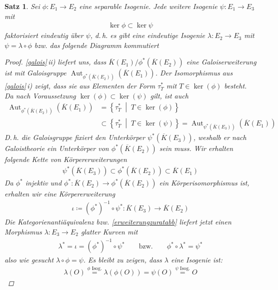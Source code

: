 \documentclass[english, german, parskip=half]{scrartcl}
\newtheorem{Satz}{Satz}[section]
\theoremstyle{definition}
\theoremstyle{remark}
\newcommand*{\algK}{\ensuremath{\overline K}} %
\newcommand*{\longto}{\longrightarrow}
\renewcommand{\O}{O}
\DeclareMathOperator{\Aut}{Aut} %
\begin{document}
\begin{Satz}\label{homomorphiesatz}
  Sei $\phi\colon E_1\to E_2$ eine separable Isogenie.
  Jede weitere Isogenie $\psi\colon E_1\to E_3$ mit
  \begin{gather*}
    \ker\phi \subset \ker\psi
  \end{gather*}
  faktorisiert eindeutig über $\psi$, d.\,h. es gibt eine eindeutige
  Isogenie $\lambda\colon E_2\to E_3$ mit
  $\psi = \lambda\circ\phi$
  bzw. das folgende Diagramm kommutiert
  \begin{center}
  \end{center}
  \begin{proof}
    \autoref{galois}\,ii) liefert uns, dass
    $\algK(E_1)/\phi^*(\algK(E_2))$ eine Galoiserweiterung ist mit
  Galoisgruppe $\Aut_{\phi^*(\algK(E_2))}(\algK(E_1))$.
  Der Isomorphismus aus \autoref{galois}\,i) zeigt, dass sie aus
  Elementen der Form $\tau_T^*$ mit $T\in\ker(\phi)$ besteht.
  Da nach Voraussetzung $\ker(\phi)\subset\ker(\psi)$ gilt,
  ist auch
  \begin{align*}
    \Aut_{\phi^*(\algK(E_2))}(\algK(E_1))
    &= \left\{ \tau_T^* \;\middle|\; T\in\ker(\phi) \right\} \\
    &\subset
      \left\{ \tau_T^* \;\middle|\; T\in\ker(\psi) \right\}
      = \Aut_{\psi^*(\algK(E_3))}(\algK(E_1))
  \end{align*}
  D.\,h. die Galoisgruppe fixiert den Unterkörper
  $\psi^*(\algK(E_3))$, weshalb er nach Galoistheorie ein
  Unterkörper von $\phi^*(\algK(E_2))$ sein muss.
  Wir erhalten folgende Kette von Körpererweiterungen
  \begin{gather*}
    \psi^*(\algK(E_3)) 
    \subset \phi^*(\algK(E_2)) 
    \subset \algK(E_1)
  \end{gather*}
  Da $\phi^*$ injektiv und 
  $\phi^*\colon\algK(E_2)\to\phi^*(\algK(E_2))$ ein
  Körperisomorphismus ist, erhalten wir eine Körpererweiterung
  \begin{gather*}
    \iota\coloneqq 
    (\phi^*)^{-1} \circ \psi^*
    \colon \algK(E_3) \longto \algK(E_2)
  \end{gather*}
  Die Kategorienantiäquivalenz bzw. \autoref{erweiterungzuratabb}
  liefert jetzt einen Morphismus $\lambda\colon E_3\to E_2$ glatter
  Kurven mit
  \begin{gather*}
    \lambda^* = \iota = (\phi^*)^{-1} \circ \psi^*
    \qquad\text{bzw.}\qquad
    \phi^*\circ\lambda^* = \psi^*
  \end{gather*}
  also wie gesucht $\lambda\circ\phi = \psi$.
  Es bleibt zu zeigen, dass $\lambda$ eine Isogenie ist:
  \begin{gather*}
    \lambda(\O) 
    \overset{\text{$\phi$ Isog.}}{=} \lambda(\phi(\O))
    = \psi(\O) 
    \overset{\text{$\psi$ Isog.}}{=} \O
  \end{gather*}
\end{proof}
\end{Satz}
\end{document}
